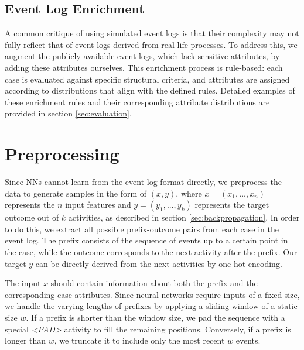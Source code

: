 
\subsection{Event Log Enrichment}
A common critique of using simulated event logs
is that their complexity may not fully reflect that of event logs derived from real-life processes.
To address this, we augment the publicly available event logs, which lack sensitive attributes,
by adding these attributes ourselves.
This enrichment process is rule-based:
each case is evaluated against specific structural criteria,
and attributes are assigned according to distributions that align with the defined rules.
Detailed examples of these enrichment rules
and their corresponding attribute distributions are provided in section \ref{sec:evaluation}.

\section{Preprocessing}
Since NNs cannot learn from the event log format directly,
we preprocess the data to generate samples in the form of $(x,y)$,
where $x = (x_1, ..., x_n)$ represents the $n$ input features and $y = (y_1, ..., y_k)$ represents the target outcome
out of $k$ activities, as described in section \ref{sec:backpropagation}. 
In order to do this, we extract all possible prefix-outcome pairs from each case in the event log.
The prefix consists of the sequence of events up to a certain point in the case,
while the outcome corresponds to the next activity after the prefix.
Our target $y$ can be directly derived from the next activities by one-hot encoding.

The input $x$ should contain information about both the prefix and the corresponding case attributes.
Since neural networks require inputs of a fixed size,
we handle the varying lengths of prefixes by applying a sliding window of a static size $w$.
If a prefix is shorter than the window size,
we pad the sequence with a special \textit{<PAD>} activity to fill the remaining positions.
Conversely, if a prefix is longer than $w$, we truncate it to include only the most recent $w$ events. 

